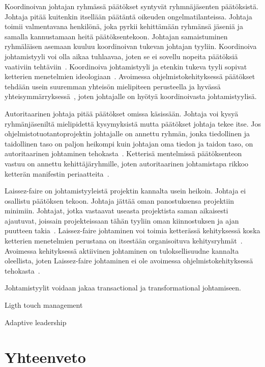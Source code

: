 \documentclass[finnish]{tktltiki2}
\theoremstyle{definition}
\theoremstyle{remark}
\begin{document}
Koordinoivan johtajan ryhmässä päätökset syntyvät ryhmnäjäsenten päätöksistä. Johtaja pitää kuitenkin itsellään päätäntä oikeuden ongelmatilanteissa. Johtaja toimii valmentavana henkilönä, joka pyrkii kehittämään ryhmänsä jäseniä ja samalla kannustamaan heitä päätöksentekoon. Johtajan samaistuminen ryhmäläisen asemaan kuuluu koordinoivan tukevan johtajan tyyliin. Koordinoiva johtamistyyli voi olla aikaa tuhlaavaa, joten se ei sovellu nopeita päätöksiä vaativiin tehtäviin~\cite{Dhomne:2012:ITL:2382887.2382899}. Koordinoiva johtamistyyli ja etenkin tukeva tyyli sopivat ketterien menetelmien ideologiaan~\cite{fowler2001agile}. Avoimessa ohjelmistokehityksessä päätökset tehdään usein suuremman yhteisön mielipiteen perusteella ja hyvässä yhteisymmärryksessä~\cite{1385637}, joten johtajalle on hyötyä koordinoivasta johtamistyylisä.

Autoritaarinen johtaja pitää päätökset omissa käsissään. Johtaja voi kysyä ryhmänjäseniltä mielipidettä kysymyksistä mutta päätökset johtaja tekee itse. Jos ohjelmistotuotantoprojektin johtajalle on annettu ryhmän, jonka tiedollinen ja taidollinen taso on paljon heikompi kuin johtajan oma tiedon ja taidon taso, on autoritaarinen johtaminen tehokasta~\cite{Dhomne:2012:ITL:2382887.2382899}. Ketterisä mentelmissä päätöksenteon vastuu on annettu kehittäjäryhmille, joten autoritaarinen johtamistapa rikkoo ketterän manifestin periaatteita~\cite{fowler2001agile}.

Laissez-faire on johtamistyyleistä projektin kannalta usein heikoin. Johtaja ei osallistu päätöksen tekoon. Johtaja jättää oman panostuksensa projektiin minimiin. Johtajat, jotka vastaavat useasta projektista saman aikaisesti ajautuvat, joissain projekteissaan tähän tyyliin oman kiinnostuksen ja ajan puutteen takia~\cite{Dhomne:2012:ITL:2382887.2382899}. Laissez-faire johtaminen voi toimia ketterässä kehityksessä koska ketterien menetelmien perustana on itsestään organisoituva kehitysryhmät~\cite{fowler2001agile}. Avoimessa kehityksessä aktiivinen johtaminen on tuloksellisuudne kannalta oleellista, joten Laissez-faire johtaminen ei ole avoimessa ohjelmistokehityksessä tehokasta~\cite{Li:2006:MOS:1125170.1125182}.

Johtamistyylit voidaan jakaa transactional ja transformational johtamiseen.  

Ligth touch management

Adaptive leadership




\section{Yhteenveto}
\end{document}
